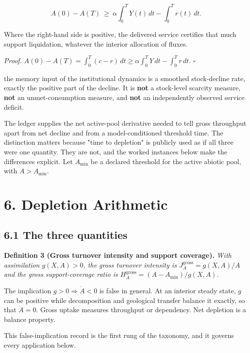\documentclass[11pt]{article}
\begin{document}
$$A(0)-A(T)\ \ge\ \alpha\int_0^TY(t)\,dt-\int_0^Tr(t)\,dt .$$

 Where the right-hand side is positive, the delivered service certifies that much support liquidation, whatever the interior allocation of fluxes.

\emph{Proof.} \(A(0)-A(T)=\allowbreak{}\int_0^T(c-r)\,\allowbreak{}dt\ge\alpha\int_0^TY\,\allowbreak{}dt-\int_0^Tr\,\allowbreak{}dt\). \(\square\)

\vspace{0.8em}

the memory input of the institutional dynamics is a smoothed stock-decline rate, exactly the positive part of the decline. It is \textbf{not} a stock-level scarcity measure, \textbf{not} an unmet-consumption measure, and \textbf{not} an independently observed service deficit.

The ledger supplies the net active-pool derivative needed to tell gross throughput apart from net decline and from a model-conditioned threshold time. The distinction matters because "time to depletion" is publicly used as if all three were one quantity. They are not, and the worked instances below make the differences explicit. Let \(A_{\min}\) be a declared threshold for the active abiotic pool, with \(A>A_{\min}\).

\section*{6. Depletion Arithmetic}\label{6-depletion-arithmetic}

\subsection*{6.1 The three quantities}\label{61-the-three-quantities}

\textbf{Definition 3 (Gross turnover intensity and support coverage).} \emph{With assimilation \(g(X,A) > 0\), the gross turnover intensity is \(J_A^{\mathrm{gross}} =\allowbreak{} g(X,\allowbreak{}A)/A\) and the gross support-coverage ratio is \(H_A^{\mathrm{gross}} =\allowbreak{} (A - A_{\min})/g(X,\allowbreak{}A)\).}

The implication \(g>0\Rightarrow\dot A<0\) is false in general. At an interior steady state, \(g\) can be positive while decomposition and geological transfer balance it exactly, so that \(\dot A=0\). Gross uptake measures throughput or dependency. Net depletion is a balance property.

This false-implication record is the first rung of the taxonomy, and it governs every application below.
\end{document}
